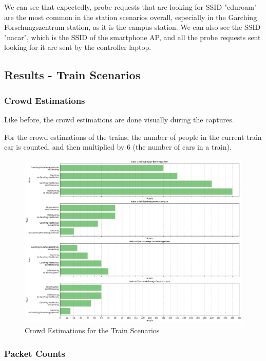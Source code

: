 \documentclass[sigconf,nonacm]{acmart}
\begin{document}
We can see that expectedly, probe requests that are looking for SSID "eduroam" are the most common in the station scenarios overall, especially in the Garching Forschungszentrum station, as it is the campus station. We can also see the SSID "nacar", which is the SSID of the smartphone AP, and all the probe requests sent looking for it are sent by the controller laptop.

\subsection{Results - Train Scenarios}
\label{sec:part-1/res-train}

\subsubsection{Crowd Estimations}
\label{sec:part-1/train/crowd-estimations}

Like before, the crowd estimations are done visually during the captures. 

For the crowd estimations of the trains, the number of people in the current train car is counted, and then multiplied by 6 (the number of cars in a train).

\begin{figure}
    \centering
    \includegraphics[width=\columnwidth]{images/part1/crowd-estimations/crowd-estimate-trains.png}
    \caption{Crowd Estimations for the Train Scenarios}
    \label{tab:crowd_estimate-trains}
\end{figure}

\subsubsection{Packet Counts}
\label{sec:part-1/train/packet-counts}
\end{document}
